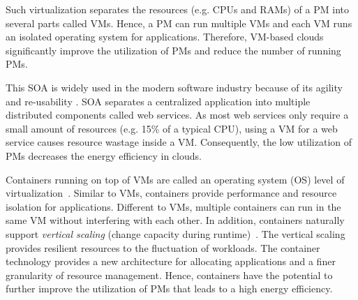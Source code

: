 Such virtualization separates the resources (e.g. CPUs and RAMs) of a PM into several parts called VMs. Hence, a PM can run multiple VMs and each VM runs an isolated operating system for applications. 
Therefore, VM-based clouds significantly improve the utilization of PMs and reduce the number of running PMs.


 This SOA is widely used in the modern software industry because of its agility and re-usability \cite{Sprott:2004wt}.
SOA separates a centralized application into multiple distributed components called web services. 
As most web services only require a small amount of resources (e.g. 15\% of a typical CPU), 
using a VM for a web service causes resource wastage inside a VM. Consequently, the low utilization of PMs decreases
the energy efficiency in clouds.


 Containers running on top of 
VMs are called an operating system (OS) level of virtualization~\cite{Soltesz:2007cu}. Similar to VMs, 
containers provide performance and resource isolation for applications. 
Different to VMs, multiple containers can run in the same VM without interfering with each other. 
In addition, containers naturally support \emph{vertical scaling} (change capacity during runtime)~\cite{Vaquero:2011gb}. 
The vertical scaling provides resilient resources to the fluctuation of workloads. The container technology provides a new architecture for allocating applications and a finer granularity of resource management. Hence, containers have the potential to further
improve the utilization of PMs that leads to a high energy efficiency.



